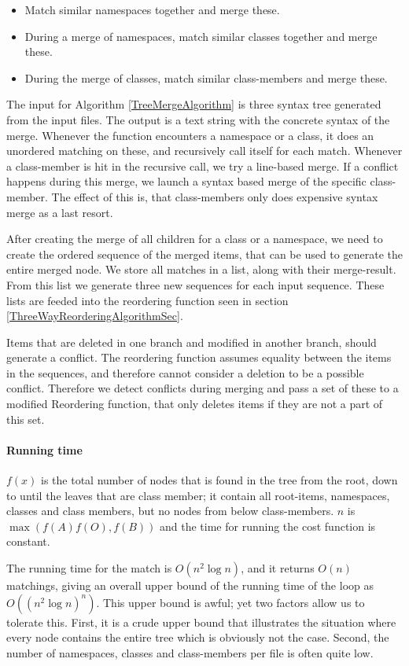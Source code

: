 \documentclass[11pt]{article}
\begin{document}
\begin{itemize}
   \item Match similar namespaces together and merge these.
   \item During a merge of namespaces, match similar classes together and merge these.
   \item During the merge of classes, match similar class-members and merge these.
\end{itemize}

The input for Algorithm \ref{TreeMergeAlgorithm} is three syntax tree generated from the input files. The output is a text string with the concrete syntax of the merge. Whenever the function encounters a namespace or a class, it does an unordered matching on these, and recursively call itself for each match. Whenever a class-member is hit in the recursive call, we try a line-based merge. If a conflict happens during this merge, we launch a syntax based merge of the specific class-member. The effect of this is, that class-members only does expensive syntax merge as a last resort.

After creating the merge of all children for a class or a namespace, we need to create the ordered sequence of the merged items, that can be used to generate the entire merged node. We store all matches in a list, along with their merge-result. From this list we generate three new sequences for each input sequence. These lists are feeded into the reordering function seen in section \ref{ThreeWayReorderingAlgorithmSec}.

Items that are deleted in one branch and modified in another branch, should generate a conflict. The reordering function assumes equality between the items in the sequences, and therefore cannot consider a deletion to be a possible conflict. Therefore we detect conflicts during merging and pass a set of these to a modified Reordering function, that only deletes items if they are not a part of this set.

\paragraph{Running time} $f(x)$ is the total number of nodes that is found in the tree from the root, down to until the leaves that are class member; it contain all root-items, namespaces, classes and class members, but no nodes from below class-members. $n$ is $\max(f(A) f(O), f(B))$ and the time for running the cost function is constant. 

The running time for the match is $O(n^2 \log n)$, and it returns $O(n)$ matchings, giving an overall upper bound of the running time of the loop as $O((n^2 \log n)^n)$. This upper bound is awful; yet two factors allow us to tolerate this. First, it is a crude upper bound that illustrates the situation where every node contains the entire tree which is obviously not the case. Second, the number of namespaces, classes and class-members per file is often quite low.
\end{document}
